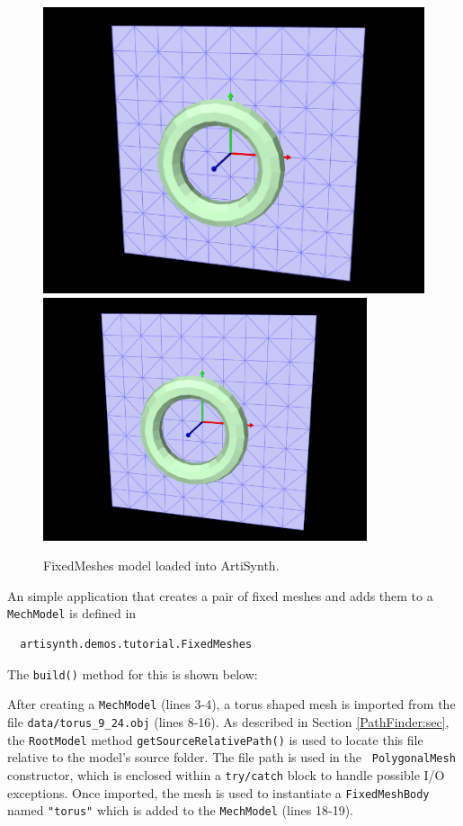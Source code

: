 \begin{figure}[h]
\begin{center}
\iflatexml
 \includegraphics[]{images/FixedMeshes}
\else
 \includegraphics[width=3.75in]{images/FixedMeshes}
\fi
\end{center}
\caption{FixedMeshes model loaded into ArtiSynth.}
\label{FixedMeshes:fig}
\end{figure}

An simple application that creates a pair of fixed meshes and adds
them to a {\tt MechModel} is defined in
%
\begin{verbatim}
  artisynth.demos.tutorial.FixedMeshes
\end{verbatim}
%
The {\tt build()} method for this is shown below:
\lstset{numbers=left}
\iflatexml

\else

\fi
\lstset{numbers=none}
%
After creating a {\tt MechModel} (lines 3-4), a torus shaped mesh is
imported from the file {\tt data/torus\_9\_24.obj} (lines 8-16). As
described in Section \ref{PathFinder:sec}, the {\tt RootModel} method
{\tt getSourceRelativePath()} is used to locate this file relative to
the model's source folder. The file path is used in the {\tt
PolygonalMesh} constructor, which is enclosed within a {\tt try/catch}
block to handle possible I/O exceptions. Once imported, the mesh is
used to instantiate a {\tt FixedMeshBody} named {\tt "torus"} which is
added to the {\tt MechModel} (lines 18-19).

